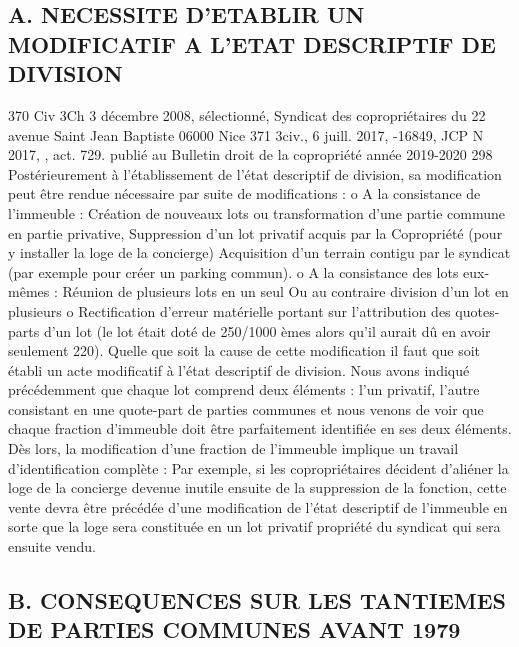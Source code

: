	\subsection{A. NECESSITE D’ETABLIR UN MODIFICATIF A L’ETAT DESCRIPTIF DE DIVISION}
	
		370 Civ 3\degres Ch 3 décembre 2008, sélectionné, Syndicat des copropriétaires du 22 avenue Saint Jean Baptiste 06000 Nice
		371 3\degres civ., 6 juill. 2017, -16849, JCP N 2017, , act. 729. publié au Bulletin
		droit de la copropriété année 2019-2020
		298
		Postérieurement à l'établissement de l'état descriptif de division, sa modification peut être rendue nécessaire par suite de modifications :
		o A la consistance de l'immeuble :
		Création de nouveaux lots ou transformation d'une partie commune en partie privative,
		Suppression d'un lot privatif acquis par la Copropriété (pour y installer la loge de la concierge)
		Acquisition d'un terrain contigu par le syndicat (par exemple pour créer un parking commun).
		o A la consistance des lots eux-mêmes :
		Réunion de plusieurs lots en un seul
		Ou au contraire division d'un lot en plusieurs
		o Rectification d'erreur matérielle portant sur l'attribution des quotes-parts d'un lot (le lot était doté de 250/1000 èmes alors qu'il aurait dû en avoir seulement 220).
		Quelle que soit la cause de cette modification il faut que soit établi un acte modificatif à l'état descriptif de division.
		Nous avons indiqué précédemment que chaque lot comprend deux éléments : l'un privatif, l'autre consistant en une quote-part de parties communes et nous venons de voir que chaque fraction d'immeuble doit être parfaitement identifiée en ses deux éléments.
		Dès lors, la modification d'une fraction de l'immeuble implique un travail d'identification complète :
		Par exemple, si les copropriétaires décident d'aliéner la loge de la concierge devenue inutile ensuite de la suppression de la fonction, cette vente devra être précédée d'une modification de l’état descriptif de l'immeuble en sorte que la loge sera constituée en un lot privatif propriété du syndicat qui sera ensuite vendu.
	
	\subsection{B. CONSEQUENCES SUR LES TANTIEMES DE PARTIES COMMUNES AVANT 1979}
	
